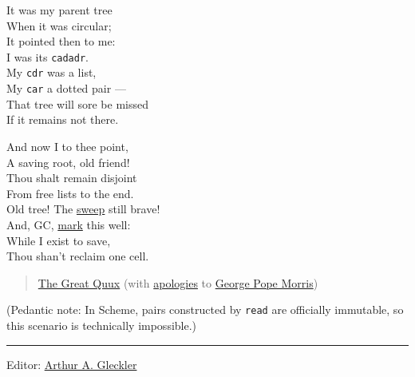 It was my parent tree\\
When it was circular;\\
It pointed then to me:\\
I was its \texttt{cadadr}.\\
My \texttt{cdr} was a list,\\
My \texttt{car} a dotted pair ---\\
That tree will sore be missed\\
If it remains not there.

And now I to thee point,\\
A saving root, old friend!\\
Thou shalt remain disjoint\\
From free lists to the end.\\
Old tree! The
\href{https://en.wikipedia.org/wiki/Tracing_garbage_collection\#Na.C3.AFve_mark-and-sweep}{sweep}
still brave!\\
And, GC,
\href{https://en.wikipedia.org/wiki/Tracing_garbage_collection\#Na.C3.AFve_mark-and-sweep}{mark}
this well:\\
While I exist to save,\\
Thou shan't reclaim one cell.

\begin{quote}
\href{https://en.wikipedia.org/wiki/Guy_L._Steele,_Jr.}{The Great Quux}
(with \href{http://www.bartleby.com/248/131.html}{apologies} to
\href{https://en.wikipedia.org/wiki/George_Pope_Morris}{George Pope
Morris})
\end{quote}

(Pedantic note: In Scheme, pairs constructed by \texttt{read} are
officially immutable, so this scenario is technically impossible.)



\begin{center}\rule{0.5\linewidth}{\linethickness}\end{center}

Editor:
\href{mailto:srfi-editors\%20at\%20srfi\%20dot\%20schemers\%20dot\%20org}{Arthur
A. Gleckler}

